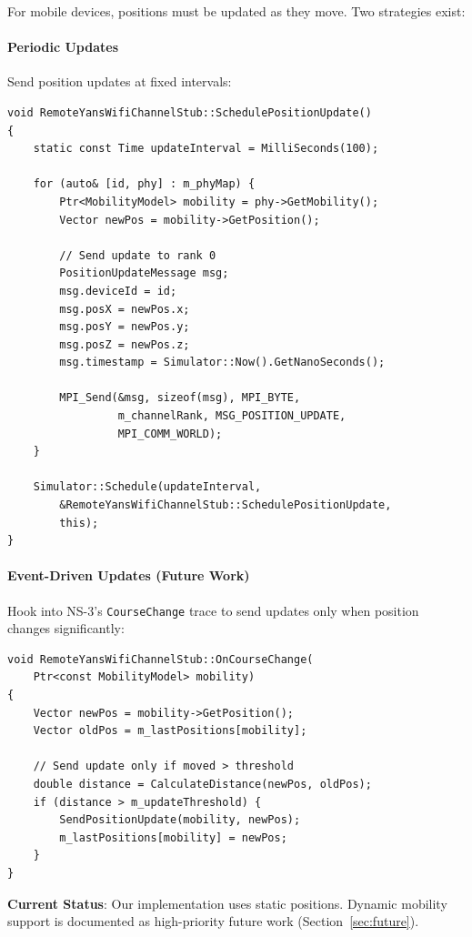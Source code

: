 For mobile devices, positions must be updated as they move. Two strategies exist:

\paragraph{Periodic Updates}
Send position updates at fixed intervals:

\begin{lstlisting}[style=cpp, caption={Periodic position updates}]
void RemoteYansWifiChannelStub::SchedulePositionUpdate()
{
    static const Time updateInterval = MilliSeconds(100);
    
    for (auto& [id, phy] : m_phyMap) {
        Ptr<MobilityModel> mobility = phy->GetMobility();
        Vector newPos = mobility->GetPosition();
        
        // Send update to rank 0
        PositionUpdateMessage msg;
        msg.deviceId = id;
        msg.posX = newPos.x;
        msg.posY = newPos.y;
        msg.posZ = newPos.z;
        msg.timestamp = Simulator::Now().GetNanoSeconds();
        
        MPI_Send(&msg, sizeof(msg), MPI_BYTE,
                 m_channelRank, MSG_POSITION_UPDATE,
                 MPI_COMM_WORLD);
    }
    
    Simulator::Schedule(updateInterval, 
        &RemoteYansWifiChannelStub::SchedulePositionUpdate,
        this);
}
\end{lstlisting}

\paragraph{Event-Driven Updates (Future Work)}
Hook into NS-3's \texttt{CourseChange} trace to send updates only when position changes significantly:

\begin{lstlisting}[style=cpp, caption={Course change callback (planned)}]
void RemoteYansWifiChannelStub::OnCourseChange(
    Ptr<const MobilityModel> mobility)
{
    Vector newPos = mobility->GetPosition();
    Vector oldPos = m_lastPositions[mobility];
    
    // Send update only if moved > threshold
    double distance = CalculateDistance(newPos, oldPos);
    if (distance > m_updateThreshold) {
        SendPositionUpdate(mobility, newPos);
        m_lastPositions[mobility] = newPos;
    }
}
\end{lstlisting}

\textbf{Current Status}: Our implementation uses static positions. Dynamic mobility support is documented as high-priority future work (Section~\ref{sec:future}).

